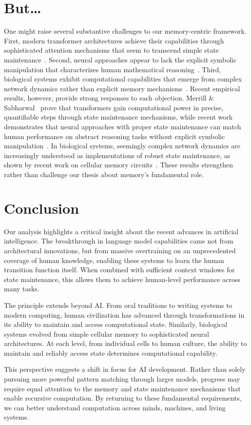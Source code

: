\documentclass[12pt]{article}
\begin{document}
\section{But\ldots}

One might raise several substantive challenges to our memory-centric framework.
First, modern transformer architectures achieve their capabilities through sophisticated attention mechanisms that seem to transcend simple state maintenance~\cite{merrill2023parallelism}.
Second, neural approaches appear to lack the explicit symbolic manipulation that characterizes human mathematical reasoning~\cite{wei2022chain}.
Third, biological systems exhibit computational capabilities that emerge from complex network dynamics rather than explicit memory mechanisms~\cite{wang2023parallel}.
Recent empirical results, however, provide strong responses to each objection.
Merrill \& Sabharwal~\cite{merrill2024} prove that transformers gain computational power in precise, quantifiable steps through state maintenance mechanisms, while recent work demonstrates that neural approaches with proper state maintenance can match human performance on abstract reasoning tasks without explicit symbolic manipulation~\cite{qiu2024ask}.
In biological systems, seemingly complex network dynamics are increasingly understood as implementations of robust state maintenance, as shown by recent work on cellular memory circuits~\cite{espinosa2024molecular}.
These results strengthen rather than challenge our thesis about memory's fundamental role.

\section{Conclusion}

Our analysis highlights a critical insight about the recent advances in artificial intelligence.
The breakthrough in language model capabilities came not from architectural innovations, but from massive overtraining on an unprecedented coverage of human knowledge, enabling these systems to learn the human transition function itself.
When combined with sufficient context windows for state maintenance, this allows them to achieve human-level performance across many tasks.

The principle extends beyond AI.
From oral traditions to writing systems to modern computing, human civilization has advanced through transformations in its ability to maintain and access computational state.
Similarly, biological systems evolved from simple cellular memory to sophisticated neural architectures.
At each level, from individual cells to human culture, the ability to maintain and reliably access state determines computational capability.

This perspective suggests a shift in focus for AI development.
Rather than solely pursuing more powerful pattern matching through larger models, progress may require equal attention to the memory and state maintenance mechanisms that enable recursive computation.
By returning to these fundamental requirements, we can better understand computation across minds, machines, and living systems.

\begingroup
\footnotesize


\endgroup
\end{document}
